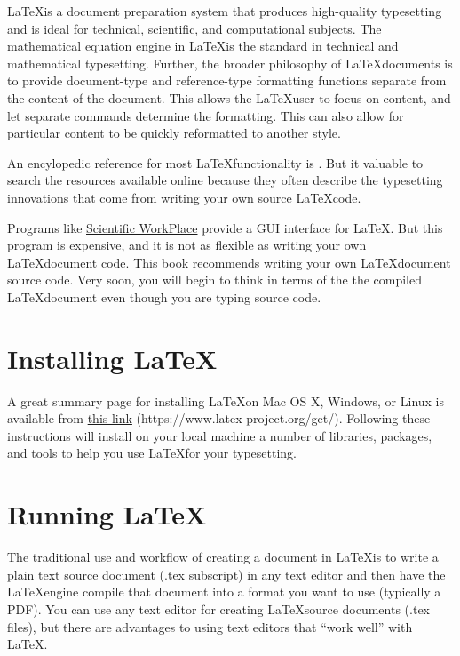 
\LaTeX is a document preparation system that produces high-quality typesetting and is ideal for technical, scientific, and computational subjects. The mathematical equation engine in \LaTeX is the standard in technical and mathematical typesetting. Further, the broader philosophy of \LaTeX documents is to provide document-type and reference-type formatting functions separate from the content of the document. This allows the \LaTeX user to focus on content, and let separate commands determine the formatting. This can also allow for particular content to be quickly reformatted to another style.

An encylopedic reference for most \LaTeX functionality is \citet{MittelbachGoossens:2004}. But it valuable to search the resources available online because they often describe the typesetting innovations that come from writing your own source \LaTeX code.

Programs like \href{https://www.mackichan.com/index.html?products/swp.html~mainFrame}{Scientific WorkPlace} provide a GUI interface for \LaTeX. But this program is expensive, and it is not as flexible as writing your own \LaTeX document code. This book recommends writing your own \LaTeX document source code. Very soon, you will begin to think in terms of the the compiled \LaTeX document even though you are typing source code.


\section{Installing \LaTeX}\label{SecLaTeXInstall}

  A great summary page for installing \LaTeX on Mac OS X, Windows, or Linux is available from \href{https://www.latex-project.org/get/}{this link} (https://www.latex-project.org/get/). Following these instructions will install on your local machine a number of libraries, packages, and tools to help you use \LaTeX for your typesetting.


\section{Running \LaTeX}\label{SecLaTeXRun}

  The traditional use and workflow of creating a document in \LaTeX is to write a plain text source document (.tex subscript) in any text editor and then have the \LaTeX engine compile that document into a format you want to use (typically a PDF). You can use any text editor for creating \LaTeX source documents (.tex files), but there are advantages to using text editors that ``work well'' with \LaTeX.

